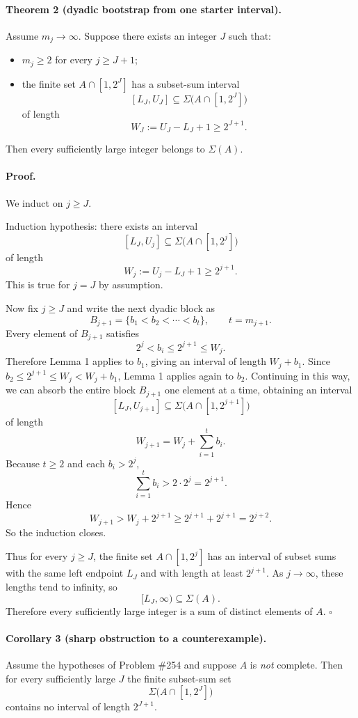 \medskip

\paragraph{Theorem 2 (dyadic bootstrap from one starter interval).}
Assume $m_j\to\infty$. Suppose there exists an integer $J$ such that:

\begin{itemize}
\item $m_j\ge 2$ for every $j\ge J+1$;
\item the finite set $A\cap[1,2^J]$ has a subset-sum interval
\[
[L_J,U_J]\subseteq \Sigma\bigl(A\cap[1,2^J]\bigr)
\]
of length
\[
W_J:=U_J-L_J+1\ge 2^{J+1}.
\]
\end{itemize}

Then every sufficiently large integer belongs to $\Sigma(A)$.

\paragraph{Proof.}
We induct on $j\ge J$.

Induction hypothesis: there exists an interval
\[
[L_J,U_j]\subseteq \Sigma\bigl(A\cap[1,2^j]\bigr)
\]
of length
\[
W_j:=U_j-L_J+1\ge 2^{j+1}.
\]
This is true for $j=J$ by assumption.

Now fix $j\ge J$ and write the next dyadic block as
\[
B_{j+1}=\{b_1<b_2<\cdots<b_t\},
\qquad t=m_{j+1}.
\]
Every element of $B_{j+1}$ satisfies
\[
2^j < b_i \le 2^{j+1} \le W_j.
\]
Therefore Lemma 1 applies to $b_1$, giving an interval of length $W_j+b_1$. Since $b_2\le 2^{j+1}\le W_j < W_j+b_1$, Lemma 1 applies again to $b_2$. Continuing in this way, we can absorb the entire block $B_{j+1}$ one element at a time, obtaining an interval
\[
[L_J,U_{j+1}]\subseteq \Sigma\bigl(A\cap[1,2^{j+1}]\bigr)
\]
of length
\[
W_{j+1}=W_j+\sum_{i=1}^{t} b_i.
\]
Because $t\ge 2$ and each $b_i>2^j$,
\[
\sum_{i=1}^{t} b_i > 2\cdot 2^j = 2^{j+1}.
\]
Hence
\[
W_{j+1}>W_j+2^{j+1}\ge 2^{j+1}+2^{j+1}=2^{j+2}.
\]
So the induction closes.

Thus for every $j\ge J$, the finite set $A\cap[1,2^j]$ has an interval of subset sums with the same left endpoint $L_J$ and with length at least $2^{j+1}$. As $j\to\infty$, these lengths tend to infinity, so
\[
[L_J,\infty)\subseteq \Sigma(A).
\]
Therefore every sufficiently large integer is a sum of distinct elements of $A$.
\hfill$\square$

\medskip

\paragraph{Corollary 3 (sharp obstruction to a counterexample).}
Assume the hypotheses of Problem \#254 and suppose $A$ is \emph{not} complete. Then for every sufficiently large $J$ the finite subset-sum set
\[
\Sigma\bigl(A\cap[1,2^J]\bigr)
\]
contains no interval of length $2^{J+1}$.

